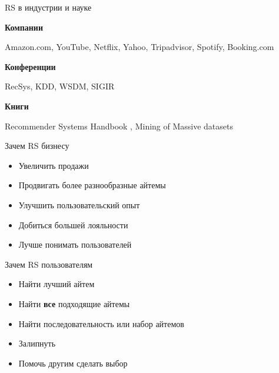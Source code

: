 \documentclass[11pt,aspectratio=169]{beamer}
\begin{document}
\begin{frame}{RS в индустрии и науке}

{\bf Компании}

Amazon.com, YouTube, Netflix, Yahoo, Tripadvisor, Spotify, Booking.com

\vfill

{\bf Конференции}

RecSys, KDD, WSDM, SIGIR

\vfill

{\bf Книги}

Recommender Systems Handbook \cite{RSHB}, Mining of Massive datasets \cite{MMDS}

\end{frame}

\begin{frame}{Зачем RS бизнесу}

\begin{itemize}[<+->]
\item Увеличить продажи
\item Продвигать более разнообразные айтемы
\item Улучшить пользовательский опыт
\item Добиться большей лояльности
\item Лучше понимать пользователей
\end{itemize}

\end{frame}

\begin{frame}{Зачем RS пользователям}

\begin{itemize}[<+->]
\item Найти лучший айтем
\item Найти {\bf все} подходящие айтемы
\item Найти последовательность или набор айтемов
\item Залипнуть
\item Помочь другим сделать выбор
\end{itemize}

\end{frame}
\end{document}
